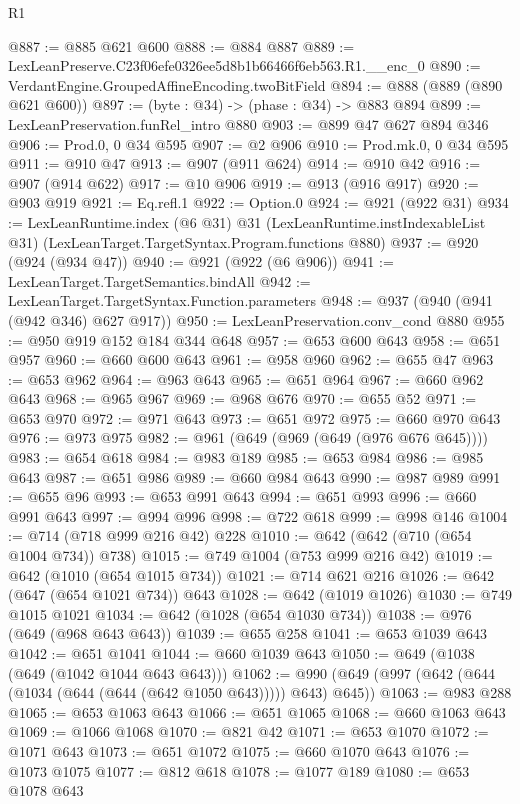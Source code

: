 \begin{lexlean}{R1}
\begin{coremodule}
@887 := @885 @621 @600
@888 := @884 @887
@889 := LexLeanPreserve.C23f06efe0326ee5d8b1b66466f6eb563.R1.__enc_0
@890 := VerdantEngine.GroupedAffineEncoding.twoBitField
@894 := @888 (@889 (@890 @621 @600))
@897 := (byte : @34) -> (phase : @34) -> @883 @894
@899 := LexLeanPreservation.funRel_intro @880
@903 := @899 @47 @627 @894 @346
@906 := Prod.{0, 0} @34 @595
@907 := @2 @906
@910 := Prod.mk.{0, 0} @34 @595
@911 := @910 @47
@913 := @907 (@911 @624)
@914 := @910 @42
@916 := @907 (@914 @622)
@917 := @10 @906
@919 := @913 (@916 @917)
@920 := @903 @919
@921 := Eq.refl.{1}
@922 := Option.{0}
@924 := @921 (@922 @31)
@934 := LexLeanRuntime.index
    (@6 @31)
    @31
    (LexLeanRuntime.instIndexableList @31)
    (LexLeanTarget.TargetSyntax.Program.functions @880)
@937 := @920 (@924 (@934 @47))
@940 := @921 (@922 (@6 @906))
@941 := LexLeanTarget.TargetSemantics.bindAll
@942 := LexLeanTarget.TargetSyntax.Function.parameters
@948 := @937 (@940 (@941 (@942 @346) @627 @917))
@950 := LexLeanPreservation.conv_cond @880
@955 := @950 @919 @152 @184 @344 @648
@957 := @653 @600 @643
@958 := @651 @957
@960 := @660 @600 @643
@961 := @958 @960
@962 := @655 @47
@963 := @653 @962
@964 := @963 @643
@965 := @651 @964
@967 := @660 @962 @643
@968 := @965 @967
@969 := @968 @676
@970 := @655 @52
@971 := @653 @970
@972 := @971 @643
@973 := @651 @972
@975 := @660 @970 @643
@976 := @973 @975
@982 := @961 (@649 (@969 (@649 (@976 @676 @645))))
@983 := @654 @618
@984 := @983 @189
@985 := @653 @984
@986 := @985 @643
@987 := @651 @986
@989 := @660 @984 @643
@990 := @987 @989
@991 := @655 @96
@993 := @653 @991 @643
@994 := @651 @993
@996 := @660 @991 @643
@997 := @994 @996
@998 := @722 @618
@999 := @998 @146
@1004 := @714 (@718 @999 @216 @42) @228
@1010 := @642 (@642 (@710 (@654 @1004 @734)) @738)
@1015 := @749 @1004 (@753 @999 @216 @42)
@1019 := @642 (@1010 (@654 @1015 @734))
@1021 := @714 @621 @216
@1026 := @642 (@647 (@654 @1021 @734)) @643
@1028 := @642 (@1019 @1026)
@1030 := @749 @1015 @1021
@1034 := @642 (@1028 (@654 @1030 @734))
@1038 := @976 (@649 (@968 @643 @643))
@1039 := @655 @258
@1041 := @653 @1039 @643
@1042 := @651 @1041
@1044 := @660 @1039 @643
@1050 := @649 (@1038 (@649 (@1042 @1044 @643 @643)))
@1062 := @990 (@649 (@997 (@642 (@644 (@1034 (@644 (@644 (@642 @1050 @643))))) @643) @645))
@1063 := @983 @288
@1065 := @653 @1063 @643
@1066 := @651 @1065
@1068 := @660 @1063 @643
@1069 := @1066 @1068
@1070 := @821 @42
@1071 := @653 @1070
@1072 := @1071 @643
@1073 := @651 @1072
@1075 := @660 @1070 @643
@1076 := @1073 @1075
@1077 := @812 @618
@1078 := @1077 @189
@1080 := @653 @1078 @643

\end{coremodule}
\end{lexlean}
